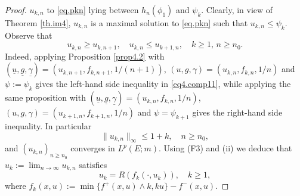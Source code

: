 \documentclass[11pt,a4paper,reqno]{amsart}
\theoremstyle{definition}
\numberwithin{equation}{section}
\begin{document}
\begin{proof}
$u_{k,n}$ to \eqref{eq.pkn}   lying between $h_n(\phi_1)$ and $\psi_k$. 
Clearly, in view of Theorem  \ref{th.im4}, $u_{k,n}$ is a maximal solution to  \eqref{eq.pkn}  such that $u_{k,n}\le \psi_k$.
Observe that
\begin{equation}
\label{eq4.comp11}
 u_{k,n}\ge u_{k,n+1},\quad u_{k,n}\le u_{k+1,n},\quad k\ge 1,\, n\ge n_0.
\end{equation}
Indeed, applying Proposition \ref{prop4.2} with $(\underline u,\underline g,\underline \gamma)= (u_{k,n+1},f_{k,n+1},1/(n+1))$,
 $(u,g,\gamma)= (u_{k,n},f_{k,n},1/n)$ and $\psi:=\psi_k$ gives the left-hand side inequality in \eqref{eq4.comp11}, while 
applying  the same proposition with 
$(\underline u,\underline g,\underline \gamma)= (u_{k,n},f_{k,n},1/n)$,
 $(u,g,\gamma)= (u_{k+1,n},f_{k+1,n},1/n)$ and $\psi=\psi_{k+1}$ gives the right-hand side inequality. 
In particular 
\[
\|u_{k,n}\|_\infty\le 1+k,\quad n\ge n_0,
\]
and  $(u_{k,n})_{n\ge n_0}$ converges in $L^p(E;m)$.
Using  (F3) and (ii) we deduce that $u_k:=\lim_{n\to \infty} u_{k,n}$ satisfies
\[
u_k=R(f_{k}(\cdot,u_k)),\quad k\ge 1,
\]
where $f_{k}(x,u):= \min\{f^+(x,u)\wedge k, ku\}-f^-(x,u).$ 


\end{proof}
\end{document}
